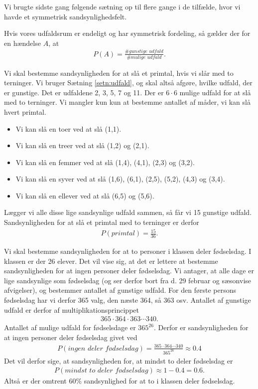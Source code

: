Vi brugte sidste gang følgende sætning op til flere gange i de tilfælde, hvor vi havde et symmetrisk sandsynlighedsfelt.
\begin{setn}\label{setn:udfald}
Hvis vores udfaldsrum er endeligt og har symmetrisk fordeling, så gælder der for en hændelse $A$, at
\begin{align*}
P(A) = \frac{\# \textit{gunstige udfald}}{\#  \textit{mulige udfald}}.
\end{align*}
\end{setn}
\begin{exa}
Vi skal bestemme sandsynligheden for at slå et primtal, hvis vi slår med to terninger.
Vi bruger Sætning \ref{setn:udfald}, og skal altså afgøre, hvilke udfald, der er gunstige. Det er udfaldene 2, 3, 5, 7 og 11. Der er $6\cdot 6$ mulige udfald for at slå med to terninger. Vi mangler kun kun at bestemme antallet af måder, vi kan slå hvert primtal. 
\begin{itemize}
\item Vi kan slå en toer ved at slå (1,1).
\item Vi kan slå en treer ved at slå (1,2) og (2,1).
\item Vi kan slå en femmer ved at slå (1,4), (4,1), (2,3) og (3,2).
\item Vi kan slå en syver ved at slå (1,6), (6,1), (2,5), (5,2), (4,3) og (3,4).
\item Vi kan slå en ellever ved at slå (6,5) og (5,6).
\end{itemize}
Lægger vi alle disse lige sandsynlige udfald sammen, så får vi 15 gunstige udfald. Sandsynligheden for at slå et primtal med to terninger er derfor 
\begin{align*}
P(\textit{primtal}) = \frac{15}{36}.
\end{align*}
\end{exa}
\begin{exa}

Vi skal bestemme sandsynligheden for at to personer i klassen deler fødselsdag. I klassen er der 26 elever. Det vil vise sig, at det er lettere at bestemme sandsynligheden for at ingen personer deler fødselsdag. Vi antager, at alle dage er lige sandsynlige som fødselsdag (og ser derfor bort fra d. 29 februar og sæsonvise afvigelser), og bestemmer antallet af gunstige udfald. For den første persons fødselsdag har vi derfor 365 valg, den næste 364, så 363 osv. Antallet af gunstige udfald er derfor af multiplikationsprincippet
\begin{align*}
365\cdot 364\cdot 363 \cdots 340.
\end{align*}
Antallet af mulige udfald for fødselsdage er $365^{26}$. Derfor er sandsynligheden for at ingen personer deler fødselsdag givet ved
\begin{align*}
P(\textit{ingen deler fødselsdag}) = \frac{365\cdot 364 \cdots 340}{365^{26}} \approx 0.4
\end{align*}
Det vil derfor sige, at sandsynligheden for, at mindst to deler fødselsdag er 
\begin{align*}
P(\textit{mindst to deler fødselsdag}) \approx 1-0.4 = 0.6.
\end{align*}
Altså er der omtrent $60\%$ sandsynlighed for at to i klassen deler fødselsdag. 
\end{exa}
